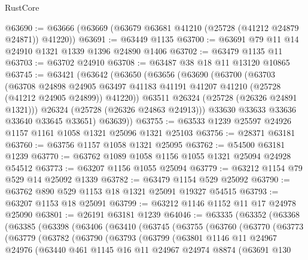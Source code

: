 \begin{lexlean}{RustCore}
\begin{coremodule}
@63690 := @63666 (@63669 (@63679 @63681 @41210 (@25728 (@41212 @24879 @24871)) @41220))
@63691 := @63449 @1135
@63700 := @63691 @79 @11 @14 @24910 @1321 @1339 @1396 @24890 @1406
@63702 := @63479 @1135 @11
@63703 := @63702 @24910
@63708 := @63487 @38 @18 @11 @13120 @10865
@63745 := @63421
    (@63642
      (@63650
        (@63656
          (@63690
            (@63700
              (@63703
                (@63708
                  @24898
                  @24905
                  @63497
                  @41183
                  @41191
                  @41207
                  @41210
                  (@25728 (@41212 @24905 @24899))
                  @41220))
              @63511
              @26324
              (@25728 (@26326 @24891 @1321)))
            @26324
            (@25728 (@26326 @24863 @24913)))
          @33630
          @33633
          @33636
          @33640
          @33645
          @33651)
        @63639))
@63755 := @63533 @1239 @25597 @24926 @1157 @1161 @1058 @1321 @25096 @1321 @25103
@63756 := @28371 @63181
@63760 := @63756 @1157 @1058 @1321 @25095
@63762 := @54500 @63181 @1239
@63770 := @63762 @1089 @1058 @1156 @1055 @1321 @25094 @24928 @54512
@63773 := @63207 @1156 @1055 @25094
@63779 := @63212 @1154 @79 @529 @14 @25092 @1339
@63782 := @63479 @1154 @529 @25092
@63790 := @63762 @890 @529 @1153 @18 @1321 @25091 @19327 @54515
@63793 := @63207 @1153 @18 @25091
@63799 := @63212 @1146 @1152 @11 @17 @24978 @25090
@63801 := @26191 @63181 @1239
@64046 := @63335
    (@63352
      (@63368
        (@63385
          (@63398
            (@63406
              (@63410
                (@63745
                  (@63755
                    (@63760
                      (@63770
                        (@63773
                          (@63779
                            (@63782
                              (@63790
                                (@63793
                                  (@63799
                                    (@63801
                                      @1146
                                      @11
                                      @24967
                                      @24976
                                      (@63440
                                        @461
                                        @1145
                                        @16
                                        @11
                                        @24967
                                        @24974
                                        @8874
                                        (@63691
                                          @130

\end{coremodule}
\end{lexlean}
